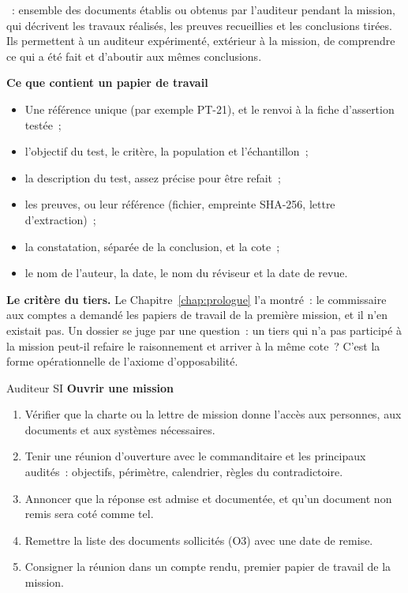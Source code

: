 \begin{boxdef}
~: ensemble des
documents établis ou obtenus par l'auditeur pendant la mission, qui
décrivent les travaux réalisés, les preuves recueillies et les conclusions
tirées. Ils permettent à un auditeur expérimenté, extérieur à la mission, de
comprendre ce qui a été fait et d'aboutir aux mêmes conclusions.
\end{boxdef}

\begin{boxprocedure}
\textbf{Ce que contient un papier de travail}
\begin{itemize}
    \item Une référence unique (par exemple PT-21), et le renvoi à la fiche
          d'assertion testée~;
    \item l'objectif du test, le critère, la population et l'échantillon~;
    \item la description du test, assez précise pour être refait~;
    \item les preuves, ou leur référence (fichier, empreinte SHA-256,
          lettre d'extraction)~;
    \item la constatation, séparée de la conclusion, et la cote~;
    \item le nom de l'auteur, la date, le nom du réviseur et la date de
          revue.
\end{itemize}
\end{boxprocedure}

\begin{boxinfo}
\textbf{Le critère du tiers.} Le Chapitre~\ref{chap:prologue} l'a montré~:
le commissaire aux comptes a demandé les papiers de travail de la première
mission, et il n'en existait pas. Un dossier se juge par une question~: un
tiers qui n'a pas participé à la mission peut-il refaire le raisonnement
et arriver à la même cote~? C'est la forme opérationnelle de l'axiome
d'opposabilité.
\end{boxinfo}

\begin{boxmetier}{Auditeur SI}
\textbf{Ouvrir une mission}
\begin{enumerate}
    \item Vérifier que la charte ou la lettre de mission donne l'accès aux
          personnes, aux documents et aux systèmes nécessaires.
    \item Tenir une réunion d'ouverture avec le commanditaire et les
          principaux audités~: objectifs, périmètre, calendrier, règles du
          contradictoire.
    \item Annoncer que la réponse \NEK{} est admise et documentée, et qu'un
          document non remis sera coté comme tel.
    \item Remettre la liste des documents sollicités (O3) avec une date de
          remise.
    \item Consigner la réunion dans un compte rendu, premier papier de
          travail de la mission.
\end{enumerate}
\end{boxmetier}

